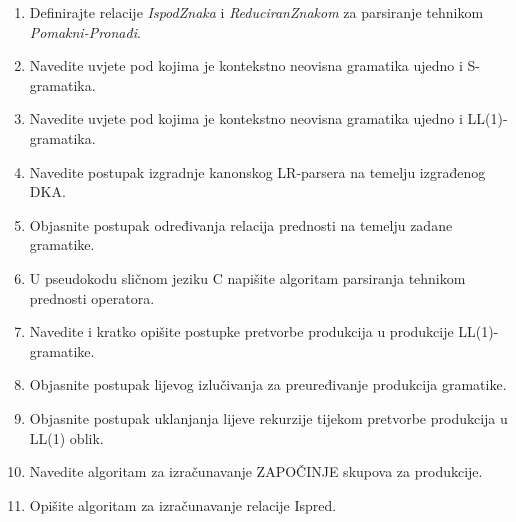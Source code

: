 \documentclass[times, 12pt, utf8]{book}
\begin{document}
\begin{enumerate}[resume]

\item
Definirajte relacije \emph{IspodZnaka} i \emph{ReduciranZnakom} za parsiranje tehnikom \emph{Pomakni-Pronađi}. \cite[str.~121-123]{udzbenik}

\item
Navedite uvjete pod kojima je kontekstno neovisna gramatika ujedno i S-gramatika. \cite[str.~87]{udzbenik}

\item
Navedite uvjete pod kojima je kontekstno neovisna gramatika ujedno i LL(1)-gramatika. \cite[str.~98]{udzbenik}

\item 
Navedite postupak izgradnje kanonskog LR-parsera na temelju izgrađenog DKA. \cite[str.~150-151]{udzbenik}

\item 
Objasnite postupak određivanja relacija prednosti na temelju zadane gramatike. \cite[str.~133-135]{udzbenik}

\item
U pseudokodu sličnom jeziku C napišite algoritam parsiranja tehnikom prednosti operatora. \cite[str.~130-133]{udzbenik}

\item
Navedite i kratko opišite postupke pretvorbe produkcija u produkcije LL(1)-gramatike. \cite[str.~107-111]{udzbenik}

\item
Objasnite postupak lijevog izlučivanja za preuređivanje produkcija gramatike. \cite[str.~108]{udzbenik}

\item
Objasnite postupak uklanjanja lijeve rekurzije tijekom pretvorbe produkcija u LL(1) oblik. \cite[str.~110-111]{udzbenik}

\item 
Navedite algoritam za izračunavanje ZAPOČINJE skupova za produkcije. \cite[str.~102-103]{udzbenik}

\item
Opišite algoritam za izračunavanje relacije Ispred. \cite[str.~105-107]{udzbenik}


\end{enumerate}
\end{document}
